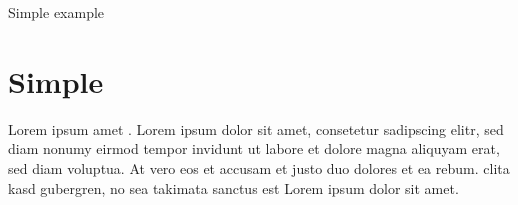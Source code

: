 \documentclass{article}
\begin{document}
{Simple example}

\section{Simple}

Lorem ipsum  amet . Lorem ipsum dolor sit
amet, consetetur sadipscing elitr, sed diam nonumy eirmod tempor
invidunt ut labore et dolore magna aliquyam erat, sed diam voluptua. At
vero eos et accusam et justo duo dolores et ea rebum.  clita
kasd gubergren, no sea takimata sanctus est Lorem ipsum dolor sit amet.
\end{document}
